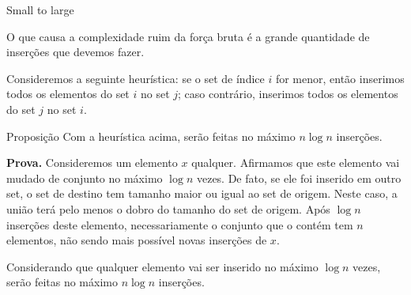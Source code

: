 \begin{frame}{Small to large}

    \footnotesize 
    O que causa a complexidade ruim da força bruta é a grande quantidade de inserções que devemos fazer. 
    
    Consideremos a seguinte heurística: se o set de índice $i$ for menor, então inserimos todos os elementos do set $i$ no set $j$; caso contrário, inserimos todos os elementos do set $j$ no set $i$.

    \begin{block}{Proposição}
        Com a heurística acima, serão feitas no máximo $n \log n$ inserções.
    \end{block}
    {\bf Prova.} Consideremos um elemento $x$ qualquer. Afirmamos que este elemento vai mudado de conjunto no máximo $\log n$ vezes. De fato, se ele foi inserido em outro set, o set de destino tem tamanho maior ou igual ao set de origem. Neste caso, a união terá pelo menos o dobro do tamanho do set de origem. Após $\log n$ inserções deste elemento, necessariamente o conjunto que o contém tem $n$ elementos, não sendo mais possível novas inserções de $x$.

    Considerando que qualquer elemento vai ser inserido no máximo $\log n$ vezes, serão feitas no máximo $n \log n$ inserções.




\end{frame}

